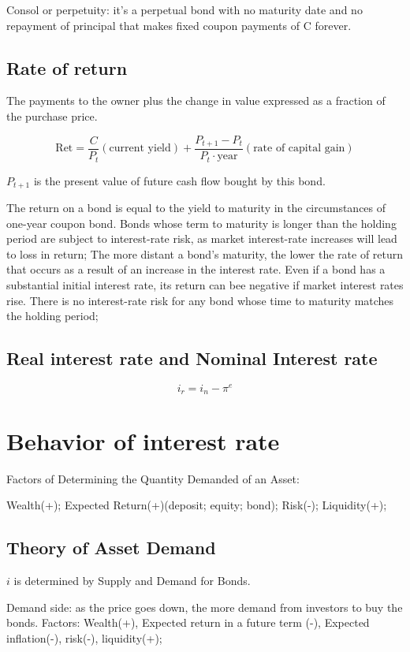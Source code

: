 \documentclass[10pt, a4paper]{article}
\begin{document}
            Consol or perpetuity: it's a perpetual bond with no maturity date and no repayment of principal that makes fixed coupon payments of C forever.
        
        \subsection{Rate of return} 
        The payments to the owner plus the change in value expressed as a fraction of the purchase price. 

        $$\text{Ret} = \frac{C}{P_t}(\text{current yield}) + \frac{P_{t + 1} - P_t}{P_t \cdot \text{year}}(\text{rate of capital gain})$$

        $P_{t+1}$ is the present value of future cash flow bought by this bond.
        
        The return on a bond is equal to the yield to maturity in the circumstances of one-year coupon bond. Bonds whose term to maturity is longer than the holding period are subject to interest-rate risk, as market interest-rate increases will lead to loss in return; The more distant a bond's maturity, the lower the rate of return that occurs as a result of an increase in the interest rate. Even if a bond has a substantial initial interest rate, its return can bee negative if market interest rates rise. There is no interest-rate risk for any bond whose time to maturity matches the holding period;
        

        \subsection{Real interest rate and Nominal Interest rate}
        $$i_r = i_n - \pi^e$$

\section{Behavior of interest  rate}
    Factors of Determining the Quantity Demanded of an Asset:
        
    Wealth(+); Expected Return(+)(deposit; equity; bond); Risk(-); Liquidity(+); 

    \subsection{Theory of Asset Demand}
        $i$ is determined by Supply and Demand for Bonds. 

        Demand side: as the price goes down, the more demand from investors to buy the bonds. Factors: Wealth(+), Expected return in a future term (-), Expected inflation(-), risk(-), liquidity(+);  
\end{document}
